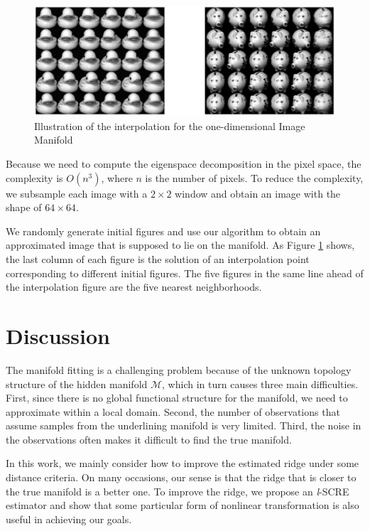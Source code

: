 \documentclass[aos,preprint]{imsart}
\theoremstyle{remark}
\begin{document}
\begin{figure}[h] %
   \includegraphics[width=\linewidth]{duck_pig.eps} 
   \caption{Illustration of the interpolation for the one-dimensional Image Manifold}
   \label{fig:interpolation demo}
\end{figure}

Because we need to compute the eigenspace decomposition in the pixel space, the complexity is $O(n^3)$, where $n$ is the number of pixels. To reduce the complexity, we subsample each image with a $2\times 2$ window and obtain an image with the shape of $64\times 64$.

We randomly generate initial figures and use our algorithm to obtain an approximated image that is supposed to lie on the manifold. As Figure \ref{fig:interpolation demo} shows, the last column of each figure is the solution of an interpolation point corresponding to different initial figures. The five figures in the same line ahead of the interpolation figure are the five nearest neighborhoods.



\section{Discussion}
The manifold fitting is a challenging problem because of the unknown topology structure of the hidden manifold $\mathcal M$, which in turn causes three main difficulties. First, since there is no global functional structure for the manifold, we need to approximate within a local domain. Second, the number of observations that assume samples from the underlining manifold is very limited. Third, the noise in the observations often makes it difficult to find the true manifold.

In this work, we mainly consider how to improve the estimated ridge under some distance criteria. On many occasions, our sense is that the ridge that is closer to the true manifold is a better one. To improve the ridge, we propose an {\it l}-SCRE estimator and show that some particular form of nonlinear transformation is also useful in achieving our goals.
\end{document}

